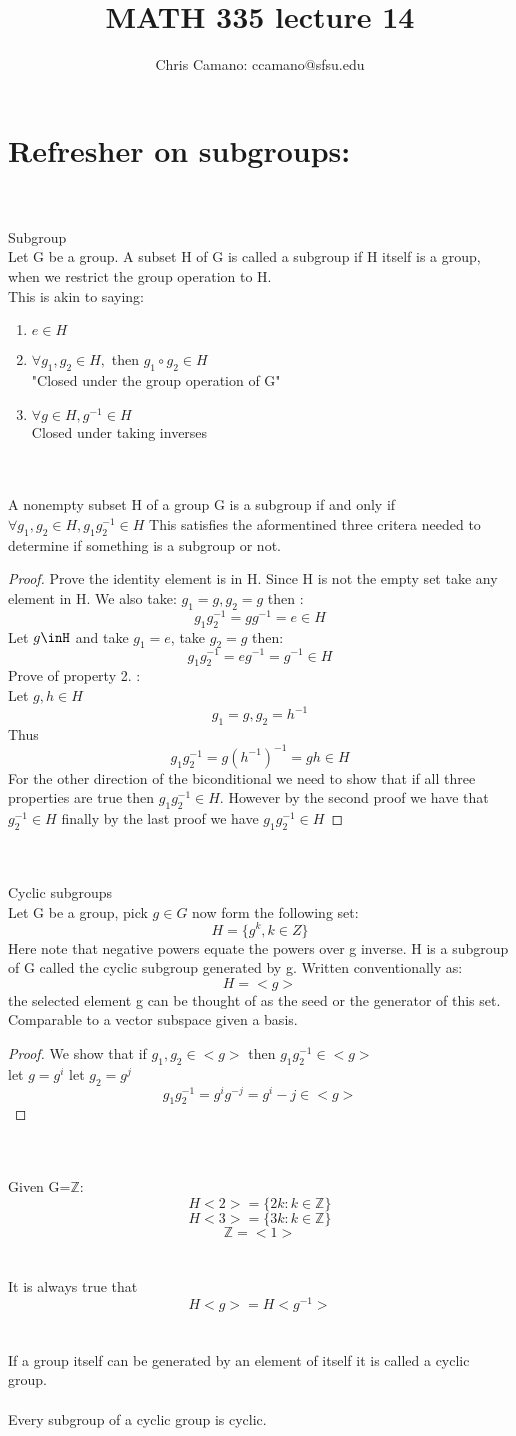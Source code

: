 \documentclass[11pt]{article}
\author{Chris Camano: ccamano@sfsu.edu}
\title{MATH 335  lecture 14 }
\date
\theoremstyle{definition}  %
\newcommand{\Z}{\mathbb{Z}}
\newcommand{\bigline}{\\\noindent\makebox[\linewidth]{\rule{\paperwidth}{0.4pt}}\\}
\begin{document}
\maketitle
\section{Refresher on subgroups:}
\bigline

 Subgroup\\
Let G be a group. A subset H of G is called a subgroup if H itself is a group, when we restrict the group operation to H.\\
This is akin to saying:
\begin{enumerate}
  \item $e\in H$
  \item $\forall g_1,g_2 \in H,$ then $ g_1\circ g_2\in H $\\"Closed under the group operation of G"
  \item $\forall g\in H, g^{-1}\in H$\\
  Closed under taking inverses
\end{enumerate}
\bigline
\proposition A nonempty subset H of a group G is a subgroup if and only if $\forall g_1,g_2\in H, g_1g_2^{-1}\in H$ This satisfies the aformentined three critera needed to determine if something is a subgroup or not.
\begin{proof}
  Prove the identity element is in H.
Since H is not the empty set take any element in H. We also take: $g_1=g, g_2=g$ then :
\[
  g_1g_2^{-1}=gg^{-1}=e\in H
\]
Let $g\inH$ and take $g_1=e$, take $g_2=g$ then: $$g_1g_2^{-1}=eg^{-1}=g^{-1}\in H$$
Prove of property 2. : \\
Let $g,h\in H$
\[
  g_1=g,g_2=h^{-1}
\]
Thus \[
  g_1g_2^{-1}=g(h^{-1})^{-1}=gh\in H
\]
For the other direction of the biconditional we need to show that if all three properties are true then $g_1g_2^{-1}\in H$. However by the second proof we have that $g_2^{-1}\in H$ finally by the last proof we have $g_1g_2^{-1}\in H$
\end{proof}
\bigline
{} Cyclic subgroups\\
Let G be a group, pick $g\in G$ now form the following set:
\[
  H=\{ g^k, k\in Z\}
\]
Here note that negative powers equate the powers over g inverse. H is a subgroup of G called the cyclic subgroup generated by g. Written conventionally as:
\[
  H=<g>
\]
the selected element g can be thought of as the seed or the generator of this set. \\ Comparable to a vector  subspace given a basis.
\begin{proof}
  We show that if $g_1,g_2\in <g>$ then $g_1g_2^{-1}\in<g>$\\
  let $g=g^i$ let $g_2=g^j$
  \[
    g_1g_2^{-1}=g^ig^{-j}=g^i-j\in <g>
  \]
\end{proof}
\bigline
Given G=$\mathbb{Z}$:
\[
  H<2>=\{2k:k\in \Z\}
\]
\[
  H<3>=\{3k:k\in \Z\}
\]
\[
  \mathbb{Z}=<1>
\]
\bigline
It is always true that
\[
  H<g>=H<g^{-1}>
\]
\bigline
If a group itself can be generated by an element of itself it is called a cyclic group.\\\\
Every subgroup of a cyclic group is cyclic.
\end{document}

